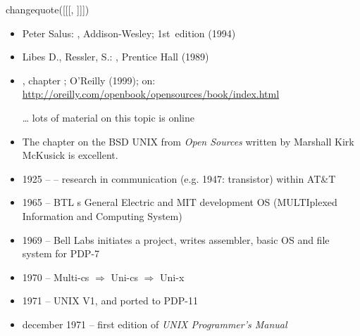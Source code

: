 
changequote([[[, ]]])


\begin{slide}
\begin{itemize}
\item Peter Salus: , Addison-Wesley;
1st~edition (1994)
\item Libes D., Ressler, S.: , Prentice Hall (1989)
\item {},
chapter ; O'Reilly (1999); on:
\url{http://oreilly.com/openbook/opensources/book/index.html}
\item[\ldots] lots of material on this topic is online
\end{itemize}
\end{slide}

\begin{itemize}
\item The chapter on the BSD UNIX from \emph{Open Sources} written by Marshall
Kirk McKusick is excellent.
\end{itemize}


\begin{slide}
\begin{itemize}
\item 1925 --  -- research in
communication (e.g. 1947: transistor) within AT\&T
\item 1965 -- BTL s General Electric and MIT development OS 
(MULTIplexed Information and Computing System) 
\item 1969 -- Bell Labs initiates a project,  writes
assembler, basic OS and file system for PDP-7 
\item 1970 -- Multi-cs $\Rightarrow$ Uni-cs $\Rightarrow$ Uni-x
\item 1971 -- UNIX V1, and ported to PDP-11
\item december 1971 -- first edition of \emph{UNIX Programmer's Manual}
\end{itemize}
\end{slide}

